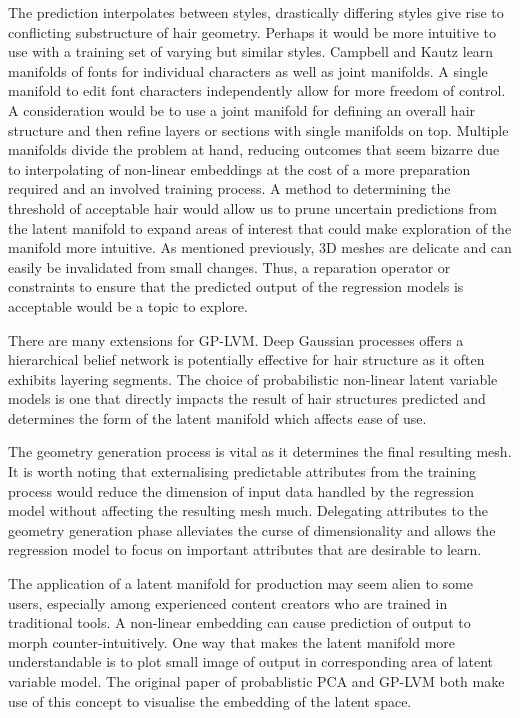 \documentclass[ %
author={Dillon Keith Diep},
supervisor={Dr. Carl Henrik Ek},
degree={MEng},
title={ART-CG Hair:},
subtitle={Assisted Real-time Content Generation of Stylised Virtual Hair},
type={Research},
year={2017} ]{dissertation}
\begin{document}
The prediction interpolates between styles, drastically differing styles give rise to conflicting substructure of hair geometry. Perhaps it would be more intuitive to use with a training set of varying but similar styles. Campbell and Kautz \cite{fontmanifold} learn manifolds of fonts for individual characters as well as joint manifolds. A single manifold to edit font characters independently allow for more freedom of control. A consideration would be to use a joint manifold for defining an overall hair structure and then refine layers or sections with single manifolds on top. Multiple manifolds divide the problem at hand, reducing outcomes that seem bizarre due to interpolating of non-linear embeddings at the cost of a more preparation required and an involved training process.
A method to determining the threshold of acceptable hair would allow us to prune uncertain predictions from the latent manifold to expand areas of interest that could make exploration of the manifold more intuitive. 
As mentioned previously, 3D meshes are delicate and can easily be invalidated from small changes. Thus, a reparation operator or constraints to ensure that the predicted output of the regression models is acceptable would be a topic to explore.

There are many extensions for GP-LVM. Deep Gaussian processes \cite{deepgp} offers a hierarchical belief network is potentially effective for hair structure as it often exhibits layering segments.
The choice of probabilistic non-linear latent variable models is one that directly impacts the result of hair structures predicted and determines the form of the latent manifold which affects ease of use.

The geometry generation process is vital as it determines the final resulting mesh. It is worth noting that externalising predictable attributes from the training process would reduce the dimension of input data handled by the regression model without affecting the resulting mesh much. Delegating attributes to the geometry generation phase alleviates the curse of dimensionality and allows the regression model to focus on important attributes that are desirable to learn.

The application of a latent manifold for production may seem alien to some users, especially among experienced content creators who are trained in traditional tools. A non-linear embedding can cause prediction of output to morph counter-intuitively. One way that makes the latent manifold more understandable is to plot small image of output in corresponding area of latent variable model. The original paper of probablistic PCA and GP-LVM both make use of this concept to visualise the embedding of the latent space.
\end{document}
